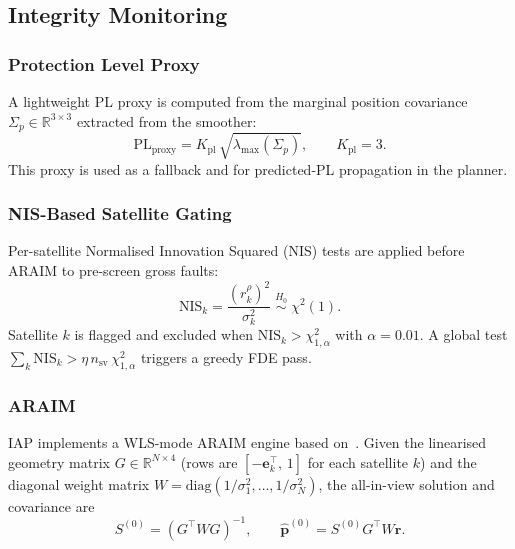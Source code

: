 \documentclass[journal]{IEEEtran}
\newcommand{\R}{\mathbb{R}}
\newcommand{\diag}{\mathrm{diag}}
\begin{document}
\subsection{Integrity Monitoring}
\label{sec:integrity}

\subsubsection{Protection Level Proxy}
\label{sec:pl_proxy}

A lightweight PL proxy is computed from the marginal position
covariance $\Sigma_p \in \R^{3\times3}$ extracted from the smoother:
\begin{equation}
  \mathrm{PL}_{\mathrm{proxy}} = K_{\mathrm{pl}}\,
    \sqrt{\lambda_{\max}(\Sigma_p)},
    \qquad K_{\mathrm{pl}} = 3.
  \label{eq:pl_proxy}
\end{equation}
This proxy is used as a fallback and for predicted-PL propagation in
the planner.

\subsubsection{NIS-Based Satellite Gating}
\label{sec:nis}

Per-satellite Normalised Innovation Squared (NIS) tests are applied
before ARAIM to pre-screen gross faults:
\begin{equation}
  \mathrm{NIS}_k = \frac{(r_k^\rho)^2}{\sigma_k^2}
  \;\overset{H_0}{\sim}\; \chi^2(1).
  \label{eq:nis}
\end{equation}
Satellite $k$ is flagged and excluded when
$\mathrm{NIS}_k > \chi^2_{1,\alpha}$ with $\alpha = 0.01$.
A global test $\sum_k \mathrm{NIS}_k > \eta\, n_{\mathrm{sv}}\,\chi^2_{1,\alpha}$
triggers a greedy FDE pass.

\subsubsection{ARAIM}
\label{sec:araim}

IAP implements a WLS-mode ARAIM engine based on~\cite{blanch2015}.
Given the linearised geometry matrix $G \in \R^{N\times4}$ (rows are
$[-\mathbf{e}_k^\top,\,1]$ for each satellite $k$) and the diagonal
weight matrix $W = \diag(1/\sigma_1^2,\ldots,1/\sigma_N^2)$, the
all-in-view solution and covariance are
\begin{equation}
  S^{(0)} = (G^\top W G)^{-1}, \qquad
  \hat{\mathbf{p}}^{(0)} = S^{(0)} G^\top W \mathbf{r}.
  \label{eq:wls_full}
\end{equation}
\end{document}
